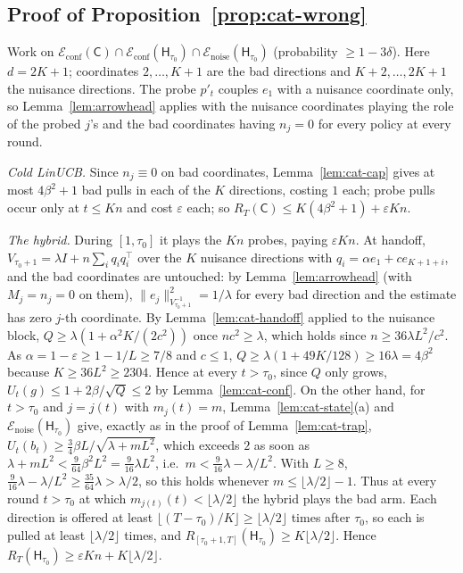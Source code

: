 \documentclass{article}
\theoremstyle{definition}
\theoremstyle{remark}
\newcommand{\eps}{\varepsilon}
\theoremstyle{remark}
\newcommand{\Cold}{\mathsf{C}}
\newcommand{\Hyb}{\mathsf{H}}
\begin{document}
\subsection{Proof of Proposition~\ref{prop:cat-wrong}}

Work on $\mathcal E_{\mathrm{conf}}(\Cold)\cap\mathcal E_{\mathrm{conf}}(\Hyb_{\tau_0})\cap\mathcal E_{\mathrm{noise}}(\Hyb_{\tau_0})$
(probability $\ge1-3\delta$). Here $d=2K+1$; coordinates $2,\dots,K+1$ are the
bad directions and $K+2,\dots,2K+1$ the nuisance directions. The probe $p'_t$
couples $e_1$ with a nuisance coordinate only, so Lemma~\ref{lem:arrowhead}
applies with the nuisance coordinates playing the role of the probed $j$'s
and the bad coordinates having $n_j=0$ for every policy at every round.

\emph{Cold LinUCB.} Since $n_j\equiv0$ on bad coordinates,
Lemma~\ref{lem:cat-cap} gives at most $4\beta^2+1$ bad pulls in each of the $K$
directions, costing $1$ each; probe pulls occur only at $t\le Kn$ and cost
$\eps$ each; so $R_T(\Cold)\le K(4\beta^2+1)+\eps Kn$.

\emph{The hybrid.} During $[1,\tau_0]$ it plays the $Kn$ probes, paying $\eps Kn$.
At handoff, $V_{\tau_0+1}=\lambda I+n\sum_{i}q_iq_i^\top$ over the $K$ nuisance
directions with $q_i=\alpha e_1+ce_{K+1+i}$, and the bad coordinates are
untouched: by Lemma~\ref{lem:arrowhead} (with $M_j=n_j=0$ on them),
$\|e_j\|^2_{V_{\tau_0+1}^{-1}}=1/\lambda$ for every bad direction and the estimate
has zero $j$-th coordinate. By Lemma~\ref{lem:cat-handoff} applied to the
nuisance block, $Q\ge\lambda(1+\alpha^2K/(2c^2))$ once $nc^2\ge\lambda$, which holds
since $n\ge36\lambda L^2/c^2$. As $\alpha=1-\eps\ge1-1/L\ge7/8$ and $c\le1$,
$Q\ge\lambda(1+49K/128)\ge16\lambda=4\beta^2$ because $K\ge36L^2\ge2304$. Hence at
every $t>\tau_0$, since $Q$ only grows, $U_t(g)\le1+2\beta/\sqrt Q\le2$ by
Lemma~\ref{lem:cat-conf}. On the other hand, for $t>\tau_0$ and $j=j(t)$ with
$m_j(t)=m$, Lemma~\ref{lem:cat-state}(a) and $\mathcal E_{\mathrm{noise}}(\Hyb_{\tau_0})$
give, exactly as in the proof of Lemma~\ref{lem:cat-trap},
$U_t(b_t)\ge\tfrac34\beta L/\sqrt{\lambda+mL^2}$, which exceeds $2$ as soon as
$\lambda+mL^2<\tfrac9{64}\beta^2L^2=\tfrac9{16}\lambda L^2$, i.e.\ $m<\tfrac9{16}\lambda-\lambda/L^2$.
With $L\ge8$, $\tfrac9{16}\lambda-\lambda/L^2\ge\tfrac{35}{64}\lambda>\lambda/2$, so this holds
whenever $m\le\lfloor\lambda/2\rfloor-1$. Thus at every round $t>\tau_0$ at which
$m_{j(t)}(t)<\lfloor\lambda/2\rfloor$ the hybrid plays the bad arm. Each direction
is offered at least $\lfloor(T-\tau_0)/K\rfloor\ge\lfloor\lambda/2\rfloor$ times after
$\tau_0$, so each is pulled at least $\lfloor\lambda/2\rfloor$ times, and
$R_{[\tau_0+1,T]}(\Hyb_{\tau_0})\ge K\lfloor\lambda/2\rfloor$. Hence
$R_T(\Hyb_{\tau_0})\ge\eps Kn+K\lfloor\lambda/2\rfloor$.
\end{document}
